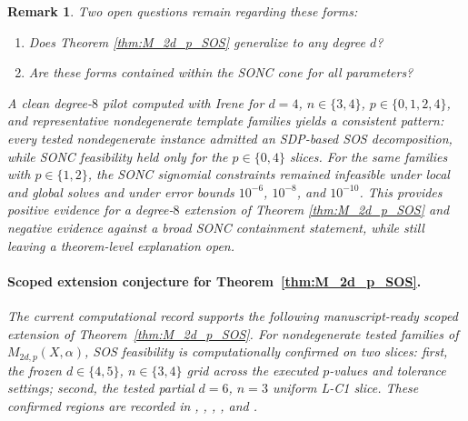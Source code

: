\documentclass{article}
\newtheorem{remark}{Remark}
\begin{document}
\begin{remark}
Two open questions remain regarding these forms:
\begin{enumerate}
    \item Does Theorem \ref{thm:M_2d_p_SOS} generalize to any degree $d$?
    \item Are these forms contained within the SONC cone for all parameters?
\end{enumerate}
A clean degree-$8$ pilot computed with Irene \cite{GMIr} for $d=4$, $n \in \{3,4\}$,
$p \in \{0,1,2,4\}$, and representative nondegenerate template families yields a
consistent pattern: every tested nondegenerate instance admitted an SDP-based SOS
decomposition, while SONC feasibility held only for the $p \in \{0,4\}$ slices.
For the same families with $p \in \{1,2\}$, the SONC signomial constraints remained
infeasible under local and global solves and under error bounds $10^{-6}$, $10^{-8}$,
and $10^{-10}$. This provides positive evidence for a degree-$8$ extension of
Theorem \ref{thm:M_2d_p_SOS} and negative evidence against a broad SONC
containment statement, while still leaving a theorem-level explanation open.

\paragraph{Scoped extension conjecture for Theorem~\ref{thm:M_2d_p_SOS}.}
The current computational record supports the following manuscript-ready scoped
extension of Theorem~\ref{thm:M_2d_p_SOS}. For nondegenerate tested families of
$M_{2d,p}(X,\alpha)$, SOS feasibility is computationally confirmed on two slices:
first, the frozen $d\in\{4,5\}$, $n\in\{3,4\}$ grid across the executed
$p$-values and tolerance settings; second, the tested partial $d=6$, $n=3$
uniform L-C1 slice. These confirmed regions are recorded in
, ,
,
, and
.


\end{remark}
\end{document}
